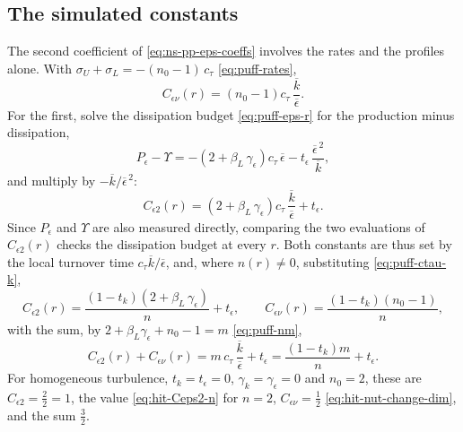 \documentclass{article}
\begin{document}
\subsection{The simulated constants}\label{ssec:puff-constants}
The second coefficient of \eqref{eq:ns-pp-eps-coeffs} involves the rates and
the profiles alone. With $\sigma_U + \sigma_L = -(n_0 - 1)\, c_\tau$
\eqref{eq:puff-rates},
\begin{equation*}
  C_{\epsilon\nu}(r) = \left( n_0 - 1 \right) c_\tau\, \frac{\overline{k}}{\overline{\epsilon}} .
\end{equation*}
For the first, solve the dissipation budget \eqref{eq:puff-eps-r} for the
production minus dissipation,
\begin{equation*}
  P_\epsilon - \Upsilon
  = -\left( 2 + \beta_L\, \gamma_\epsilon \right) c_\tau\, \overline{\epsilon}
  - t_\epsilon\, \frac{\overline{\epsilon}^{\,2}}{\overline{k}} ,
\end{equation*}
and multiply by $-\overline{k}/\overline{\epsilon}^{\,2}$:
\begin{equation*}
  C_{\epsilon 2}(r)
  = \left( 2 + \beta_L\, \gamma_\epsilon \right) c_\tau\, \frac{\overline{k}}{\overline{\epsilon}} + t_\epsilon .
\end{equation*}
Since $P_\epsilon$ and $\Upsilon$ are also measured directly, comparing the
two evaluations of $C_{\epsilon 2}(r)$ checks the dissipation budget at every
$r$. Both constants are thus set by the local turnover time
$c_\tau \overline{k}/\overline{\epsilon}$, and, where $n(r) \neq 0$,
substituting \eqref{eq:puff-ctau-k},
\begin{equation}\label{eq:puff-constants}
  C_{\epsilon 2}(r) = \frac{\left( 1 - t_k \right) \left( 2 + \beta_L\, \gamma_\epsilon \right)}{n} + t_\epsilon ,
  \qquad
  C_{\epsilon\nu}(r) = \frac{\left( 1 - t_k \right) \left( n_0 - 1 \right)}{n} ,
\end{equation}
with the sum, by $2 + \beta_L \gamma_\epsilon + n_0 - 1 = m$ \eqref{eq:puff-nm},
\begin{equation}\label{eq:puff-constants-sum}
  C_{\epsilon 2}(r) + C_{\epsilon\nu}(r)
  = m\, c_\tau\, \frac{\overline{k}}{\overline{\epsilon}} + t_\epsilon
  = \frac{\left( 1 - t_k \right) m}{n} + t_\epsilon .
\end{equation}
For homogeneous turbulence, $t_k = t_\epsilon = 0$, $\gamma_k = \gamma_\epsilon = 0$
and $n_0 = 2$, these are $C_{\epsilon 2} = \tfrac22 = 1$, the value
\eqref{eq:hit-Ceps2-n} for $n = 2$, $C_{\epsilon\nu} = \tfrac12$
\eqref{eq:hit-nut-change-dim}, and the sum $\tfrac32$.
\end{document}
